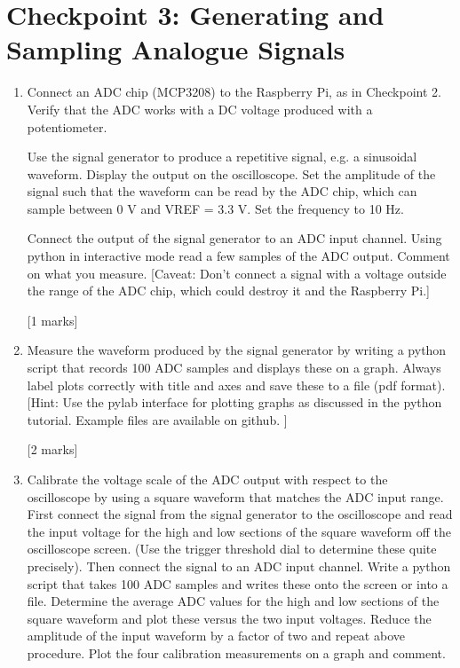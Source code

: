 \newpage
\section{Checkpoint 3:  Generating and Sampling Analogue Signals}

\begin{enumerate}

\item [3.1.] Connect an ADC chip (MCP3208) to the Raspberry Pi, as in Checkpoint 2. Verify that the ADC works with a DC voltage produced with a potentiometer.

Use the signal generator to produce a repetitive signal, e.g. a sinusoidal waveform. Display the output on the oscilloscope. Set the amplitude of the signal such that the waveform can be read by the ADC chip, which can sample between 0 V and VREF = 3.3 V. Set the frequency to 10 Hz.  

Connect the output of the signal generator to an ADC input channel. Using python in interactive mode read a few samples of the ADC output. Comment on what you measure. [Caveat: Don't connect a signal with a voltage outside the range of the ADC chip, which could destroy it and the Raspberry Pi.] 

\hfill [1 marks]\\

\item [3.2.] Measure the waveform produced by the signal generator by writing a python script that records 100 ADC samples and displays these on a graph. Always label plots correctly with title and axes and save these to a file (pdf format). 
[Hint: Use the pylab interface for plotting graphs as discussed in the python tutorial. Example files are available on github. ]

\hfill [2 marks] \\

\item [3.3.] Calibrate the voltage scale of the ADC output with respect to the oscilloscope by using a square waveform that matches the ADC input range.  First connect the signal from the signal generator to the oscilloscope and read the input voltage for the high and low sections of the square waveform off the oscilloscope screen. (Use the trigger threshold dial to determine these quite precisely). Then connect the signal to an ADC input channel. Write a python script that takes 100 ADC samples and writes these onto the screen or into a file. Determine the average ADC values for the high and low sections of the square waveform and plot these versus the two input voltages. Reduce the amplitude of the input waveform by a factor of two and repeat above procedure.  Plot the four calibration measurements on a graph and comment.


\end{enumerate}
